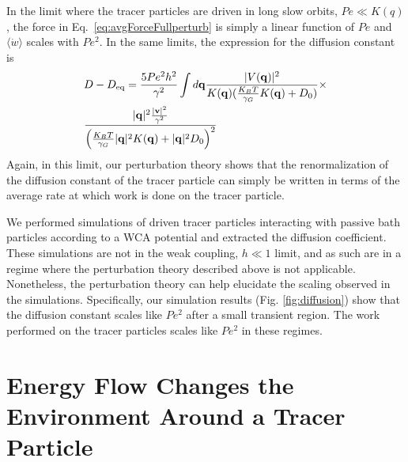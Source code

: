 \documentclass[pre,amsmath,preprintnumbers,10pt,article,notitlepage,twocolumn]{revtex4-1}
\begin{document}
In the limit where the tracer particles are driven in long slow orbits, $Pe\ll K(q)$, the force in Eq.~\ref{eq:avgForceFullperturb} is simply a linear function of $Pe$ and $\langle \dot{w} \rangle$ scales with $Pe^2$. In the same limits, the expression for the diffusion constant is 
\begin{equation}
\begin{split}
& D -D_{\rm eq}=  \dfrac{5 Pe^2 h^2}{\gamma^2}  \int d{\bf q} \dfrac{ |V({\bf q})|^2 } { K({\bf q}) ( \frac{K_BT}{\gamma_G}  K({\bf q}) +  D_0 )}  \times \\ &\dfrac{|{\bf q}|^2 \frac{|{\bf v}|^2}{\gamma^2}}{\left(  \frac{K_BT}{\gamma_G} |{\bf q}|^2 K({\bf q}) +  |{\bf q}|^2 D_0 \right)^2}
\end{split}
\end{equation}
Again, in this limit, our perturbation theory shows that the renormalization of the diffusion constant of the tracer particle can simply be written in terms of the average rate at which work is done on the tracer particle. 

We performed simulations of driven tracer particles interacting with passive bath particles according to a WCA potential and extracted the diffusion coefficient. These simulations are not in the weak coupling, $h \ll 1 $ limit, and as such are in a regime where the perturbation theory described above is not applicable. Nonetheless, the perturbation theory can help elucidate the scaling observed in the simulations. Specifically,  our simulation results (Fig. \ref{fig:diffusion}) show that the diffusion constant scales like $Pe^2$ after a small transient region. The work performed on the tracer particles scales like $Pe^2$ in these regimes. 




\section{Energy Flow Changes the Environment Around a Tracer Particle}
\end{document}
